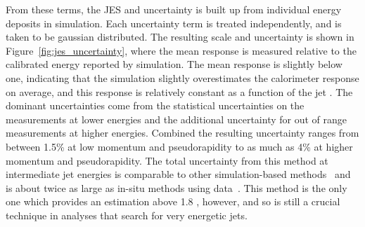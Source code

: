 From these terms, the \acl{JES} and uncertainty is built up from individual energy deposits in simulation. 
Each uncertainty term is treated independently, and is taken to be gaussian distributed.
The resulting scale and uncertainty is shown in Figure~\ref{fig:jes_uncertainty}, where the mean response is measured relative to the calibrated energy reported by simulation.
The mean response is slightly below one, indicating that the simulation slightly overestimates the calorimeter response on average, and this response is relatively constant as a function of the jet \pt.
The dominant uncertainties come from the statistical uncertainties on the \ep measurements at lower energies and the additional uncertainty for out of range measurements at higher energies.
Combined the resulting uncertainty ranges from between 1.5\% at low momentum and pseudorapidity to as much as 4\% at higher momentum and pseudorapidity.
The total uncertainty from this method at intermediate jet energies is comparable to other simulation-based methods~\cite{PERF-2011-03} and is about twice as large as in-situ methods using data~\cite{PERF-2012-01}. 
This method is the only one which provides an estimation above 1.8 \TeV, however, and so is still a crucial technique in analyses that search for very energetic jets.

